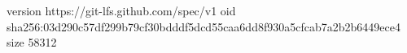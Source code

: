 version https://git-lfs.github.com/spec/v1
oid sha256:03d290c57df299b79cf30bdddf5dcd55caa6dd8f930a5cfcab7a2b2b6449ece4
size 58312
